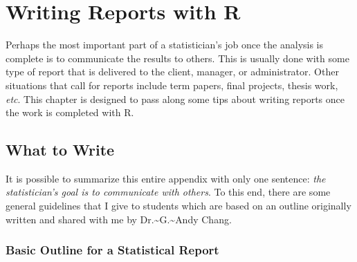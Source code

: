 \documentclass[captions=tableheading]{scrbook}
\begin{document}
\chapter{Writing Reports with \textsf{R}}
\label{sec-22}

\label{cha:Writing-Reports-with}

Perhaps the most important part of a statistician's job once the analysis is complete is to communicate the results to others. This is usually done with some type of report that is delivered to the client, manager, or administrator. Other situations that call for reports include term papers, final projects, thesis work, \emph{etc}. This chapter is designed to pass along some tips about writing reports once the work is completed with \textsf{R}.
\section{What to Write \label{sec:What-to-Write}}
\label{sec-22-1}

It is possible to summarize this entire appendix with only one sentence: \emph{the statistician's goal is to communicate with others}. To this end, there are some general guidelines that I give to students which are based on an outline originally written and shared with me by Dr.\~{}G.\~{}Andy Chang.
\subsection{Basic Outline for a Statistical Report}
\label{sec-22-1-1}
\end{document}
